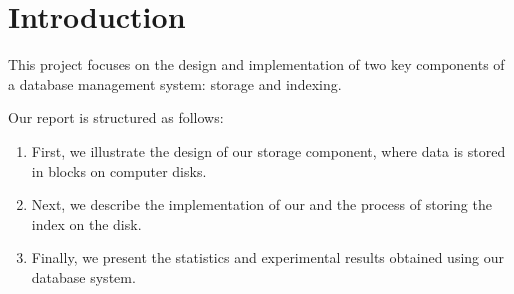 \section{Introduction}
\label{sec:intro}

This project focuses on the design and implementation of two key components of a database management system: storage and indexing.

Our report is structured as follows:

\begin{enumerate}
    \item First, we illustrate the design of our storage component, where data is stored in blocks on computer disks.
    \item Next, we describe the implementation of our \bplustree and the process of storing the index on the disk.
    \item Finally, we present the statistics and experimental results obtained using our database system.
\end{enumerate}

